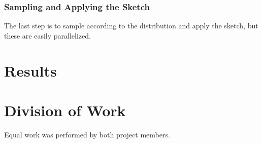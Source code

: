 \documentclass[12pt]{article}
\begin{document}
\subsubsection{Sampling and Applying the Sketch}
The last step is to sample according to the distribution and apply the sketch, but these are easily parallelized. 

\section{Results}

\section{Division of Work}
Equal work was performed by both project members. 



\end{document}
